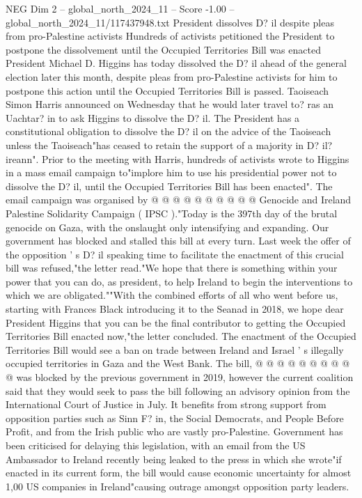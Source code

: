\begin{textsample}{NEG Dim 2 – global\_north\_2024\_11 – Score -1.00 – global\_north\_2024\_11/117437948.txt}  \label{ex:f2_neg_090}
President dissolves D? il despite pleas from pro-Palestine activists Hundreds of activists petitioned the President to postpone the dissolvement until the Occupied Territories Bill was enacted President Michael D.
Higgins has today dissolved the D? il ahead of the general election later this month, despite pleas from pro-Palestine activists for him to postpone this action until the Occupied Territories Bill is passed.
Taoiseach Simon Harris announced on Wednesday that he would later travel to? ras an Uachtar? in to ask Higgins to dissolve the D? il.
The President has a constitutional obligation to dissolve the D? il on the advice of the Taoiseach unless the Taoiseach"has ceased to retain the support of a majority in D? il? ireann".
Prior to the meeting with Harris, hundreds of activists wrote to Higgins in a mass email campaign to"implore him to use his presidential power not to dissolve the D? il, until the Occupied Territories Bill has been enacted".
The email campaign was organised by @ @ @ @ @ @ @ @ @ @ Genocide and Ireland Palestine Solidarity Campaign ( IPSC )."Today is the 397th day of the brutal genocide on Gaza, with the onslaught only intensifying and expanding.
Our government has blocked and stalled this bill at every turn.
Last week the offer of the opposition ' s D? il speaking time to facilitate the enactment of this crucial bill was refused,"the letter read."We hope that there is something within your power that you can do, as president, to help Ireland to begin the interventions to which we are obligated.""With the combined efforts of all who went before us, starting with Frances Black introducing it to the Seanad in 2018, we hope dear President Higgins that you can be the final contributor to getting the Occupied Territories Bill enacted now,"the letter concluded.
The enactment of the Occupied Territories Bill would see a ban on trade between Ireland and Israel ' s illegally occupied territories in Gaza and the West Bank.
The bill, @ @ @ @ @ @ @ @ @ @ was blocked by the previous government in 2019, however the current coalition said that they would seek to pass the bill following an advisory opinion from the International Court of Justice in July.
It benefits from strong support from opposition parties such as Sinn F? in, the Social Democrats, and People Before Profit, and from the Irish public who are vastly pro-Palestine.
Government has been criticised for delaying this legislation, with an email from the US Ambassador to Ireland recently being leaked to the press in which she wrote"if enacted in its current form, the bill would cause economic uncertainty for almost 1,00 US companies in Ireland"causing outrage amongst opposition party leaders.

\end{textsample}
